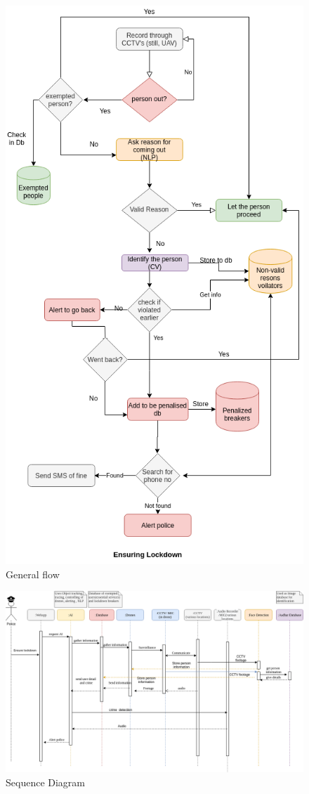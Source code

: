\documentclass[10pt,twocolumn,letterpaper]{article}
\begin{document}
 \begin{figure}
    \includegraphics[scale=0.45]{images/general_flow.png} 
  
    \caption{General flow}
    
\end{figure}
 \begin{figure}
    \includegraphics[height=.45\textwidth, width=.55\textwidth]{images/sequence_diagram.png} 
   
    \caption{Sequence Diagram}
\end{figure}
\end{document}
